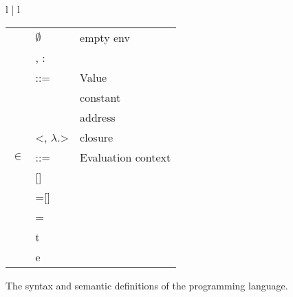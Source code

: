 \begin{figure}[!htb]
\begin{tabular}{l | l}
\begin{tabular}{r l l}
& $\emptyset$ & empty env \\
& \nonterm{H}, \nonterm{x}:\nonterm{v}  \\
\nonterm{v} & ::= & Value \\
& \nonterm{c} & constant \\
& \nonterm{l} & address \\
& <\nonterm{H}, $\lambda$\nonterm{x}.\nonterm{t}> & closure \\
\nonterm{e} $\in$ \nonterm{E} & ::= & Evaluation context \\
& [] & \\
& \KW{let} \nonterm{x}=[] \KW{in} \nonterm{e} \\
& \KW{let} \nonterm{x} = \nonterm{v} \KW{in} \nonterm{e} \\ 
& \nonterm{e} t \\
& \nonterm{v} e
\end{tabular}
\end{tabular} %
\caption{The syntax and semantic definitions of the programming language.}
\label{fig:syntax}
\end{figure}

